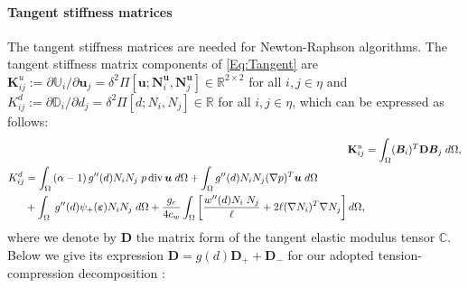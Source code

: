 \paragraph{Tangent stiffness matrices} {The tangent stiffness matrices are needed for Newton-Raphson algorithms. The tangent stiffness matrix components of \eqref{Eq:Tangent} are $\mathbf{K}_{ij}^u:=\partial\mathbb{U}_i/\partial\mathbf{u}_j=\delta^2\Pi[\bm{u};\bm{N}^{\bm{u}}_i, \bm{N}^{\bm{u}}_j]\in \mathbb{R}^{2\times 2}$ for all $i,j\in\eta$ and $ K_{ij}^d :=\partial\mathbb{D}_i/\partial {d}_j=\delta^2\Pi[{d};{N}_i, {N}_j]\in \mathbb{R}$ for all $i,j\in\eta$, which can be expressed as follows:}
\begin{subequations}
    \begin{align}
        \mathbf{K}_{ij}^u &= \int_\Omega (\bm{B}_i)^T \mathbf{D} \bm{B}_j \;d\Omega,\\
    \begin{split}
        K_{ij}^d &= \int_{\Omega} \left(\alpha-1\right)g''(d)N_iN_j \;{p} \operatorname{div} \bm{u} \; d\Omega 
        + \int_{\Omega} g''(d) N_i N_j (\nabla {p})^T \bm{u} \; d\Omega 
	    \\ &+
	    \int_\Omega \;g''(d) \psi_+(\bm{\varepsilon}) N_i N_j\; d\Omega + \frac{g_c}{4c_w} \int_\Omega \left[\frac{w''(d) N_i \; N_j}{\ell} + 2\ell (\nabla N_i)^T \nabla N_j \right]d\Omega,
    \end{split}
    \end{align}
\end{subequations}
{where we denote by $\mathbf{D}$ the matrix form of the tangent elastic modulus tensor $\mathbb{C}$. Below we give its expression $\mathbf{D}=g(d)\mathbf{D}_++\mathbf{D}_-$ for our adopted tension-compression decomposition \cite{Amor09}:}
% 
